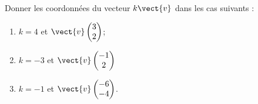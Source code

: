 
\begin{exercice}\label{exosmath-0687}

    Donner les coordonnées du vecteur \( k\vect{ v }\) dans les cas suivants :
    \begin{multicols}{3}
        \begin{enumerate}
            \item
                \( k=4\) et \( \vect{ v }\begin{pmatrix}
                    3    \\ 
                    2    
                \end{pmatrix}\);
            \item
                \( k=-3\) et \( \vect{ v }\begin{pmatrix}
                    -1    \\ 
                    2    
                \end{pmatrix}\)
            \item
                \( k=-1\) et \( \vect{ v }\begin{pmatrix}
                    -6    \\ 
                    -4    
                \end{pmatrix}\).
        \end{enumerate}
    \end{multicols}

\end{exercice}
